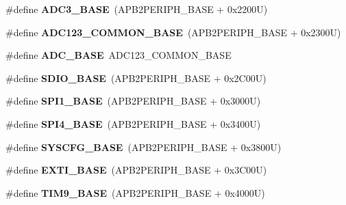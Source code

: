 \begin{DoxyCompactItemize}
\#define {\bfseries A\+D\+C3\+\_\+\+B\+A\+SE}~(A\+P\+B2\+P\+E\+R\+I\+P\+H\+\_\+\+B\+A\+SE + 0x2200\+U)
\item 
\mbox{\label{group___peripheral__memory__map_ga58b9980508ab28022e3be7edc4eda72e}} 
\#define {\bfseries A\+D\+C123\+\_\+\+C\+O\+M\+M\+O\+N\+\_\+\+B\+A\+SE}~(A\+P\+B2\+P\+E\+R\+I\+P\+H\+\_\+\+B\+A\+SE + 0x2300\+U)
\item 
\mbox{\label{group___peripheral__memory__map_gad06cb9e5985bd216a376f26f22303cd6}} 
\#define {\bfseries A\+D\+C\+\_\+\+B\+A\+SE}~A\+D\+C123\+\_\+\+C\+O\+M\+M\+O\+N\+\_\+\+B\+A\+SE
\item 
\mbox{\label{group___peripheral__memory__map_ga95dd0abbc6767893b4b02935fa846f52}} 
\#define {\bfseries S\+D\+I\+O\+\_\+\+B\+A\+SE}~(A\+P\+B2\+P\+E\+R\+I\+P\+H\+\_\+\+B\+A\+SE + 0x2\+C00\+U)
\item 
\mbox{\label{group___peripheral__memory__map_ga50cd8b47929f18b05efbd0f41253bf8d}} 
\#define {\bfseries S\+P\+I1\+\_\+\+B\+A\+SE}~(A\+P\+B2\+P\+E\+R\+I\+P\+H\+\_\+\+B\+A\+SE + 0x3000\+U)
\item 
\mbox{\label{group___peripheral__memory__map_gac5cfaedf263cee1e79554665f921c708}} 
\#define {\bfseries S\+P\+I4\+\_\+\+B\+A\+SE}~(A\+P\+B2\+P\+E\+R\+I\+P\+H\+\_\+\+B\+A\+SE + 0x3400\+U)
\item 
\mbox{\label{group___peripheral__memory__map_ga62246020bf3b34b6a4d8d0e84ec79d3d}} 
\#define {\bfseries S\+Y\+S\+C\+F\+G\+\_\+\+B\+A\+SE}~(A\+P\+B2\+P\+E\+R\+I\+P\+H\+\_\+\+B\+A\+SE + 0x3800\+U)
\item 
\mbox{\label{group___peripheral__memory__map_ga87371508b3bcdcd98cd1ec629be29061}} 
\#define {\bfseries E\+X\+T\+I\+\_\+\+B\+A\+SE}~(A\+P\+B2\+P\+E\+R\+I\+P\+H\+\_\+\+B\+A\+SE + 0x3\+C00\+U)
\item 
\mbox{\label{group___peripheral__memory__map_ga92ae902be7902560939223dd765ece08}} 
\#define {\bfseries T\+I\+M9\+\_\+\+B\+A\+SE}~(A\+P\+B2\+P\+E\+R\+I\+P\+H\+\_\+\+B\+A\+SE + 0x4000\+U)

\end{DoxyCompactItemize}
